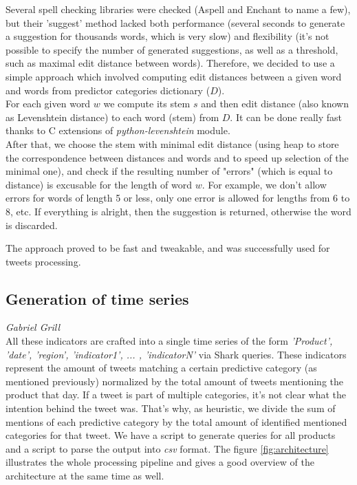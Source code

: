 Several spell checking libraries were checked (Aspell and Enchant to name a few), but their 'suggest' method lacked both performance (several seconds to generate a suggestion for thousands words, which is very slow) and flexibility (it's not possible to specify the number of generated suggestions, as well as a threshold, such as maximal edit distance between words). Therefore, we decided to use a simple approach which involved computing edit distances between a given word and words from predictor categories dictionary ($D$).
\\
For each given word $w$ we compute its stem $s$ and then edit distance (also known as Levenshtein distance) to each word (stem) from $D$. It can be done really fast thanks to C extensions of \textit{python-levenshtein} module.
\\
After that, we choose the stem with minimal edit distance (using heap to store the correspondence between distances and words and to speed up selection of the minimal one), and check if the resulting number of "errors" (which is equal to distance) is excusable for the length of word $w$. For example, we don't allow errors for words of length 5 or less, only one error is allowed for lengths from 6 to 8, etc. If everything is alright, then the suggestion is returned, otherwise the word is discarded.

The approach proved to be fast and tweakable, and was successfully used for tweets processing.

\subsection*{Generation of time series}
\emph{Gabriel Grill} \\
All these indicators are crafted into a single time series of the form \emph{'Product', 'date', 'region', 'indicator1', ... , 'indicatorN'} via Shark queries. These indicators represent the amount of tweets matching a certain predictive category (as mentioned previously) normalized by the total amount of tweets mentioning the product that day. If a tweet is part of multiple categories, it's not clear what the intention behind the tweet was. That's why, as heuristic, we divide the sum of mentions of each predictive category by the total amount of identified mentioned categories for that tweet. We have a script to generate queries for all products and a script to parse the output into \emph{csv} format. The figure \ref{fig:architecture} illustrates the whole processing pipeline and gives a good overview of the architecture at the same time as well.

